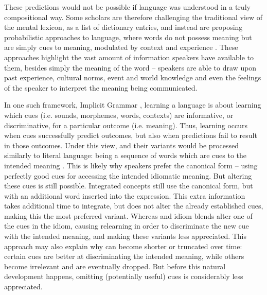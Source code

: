 \documentclass[output=paper
,modfonts
,nonflat]{langsci/langscibook}
\begin{document}
These predictions would not be possible if language was understood in a truly compositional  way. Some scholars are therefore challenging the traditional view of the mental lexicon, as a list of dictionary entries, and instead are proposing probabilistic approaches to language, where words do not possess meaning but are simply cues to meaning, modulated by context and experience \citep{Elman2004, Elman2011, RamscarBaayen2013, RamscarBaayen2013}. These approaches highlight the vast amount of information speakers have available to them, besides simply the meaning of the word -- speakers are able to draw upon past experience, cultural norms, event and world knowledge and even the feelings of the speaker to interpret the meaning being communicated. 

In one such framework, Implicit Grammar \citep{BaayenRamscar2015}, learning a language is about learning which cues (i.e. sounds, morphemes, words, contexts) are informative, or discriminative, for a particular outcome (i.e. meaning). Thus, learning occurs when cues successfully predict outcomes, but also when predictions  fail to result in those outcomes. Under this view,  and their variants  would be processed  similarly to literal  language: being a sequence of words which are cues to the intended meaning \citep[cf.][]{GeeraertEtAl2017}. This is likely why speakers prefer the canonical form -- using perfectly good cues for accessing the intended idiomatic meaning. But altering these cues is still possible. Integrated concepts  still use the canonical form, but with an additional word inserted into the expression. This extra information takes additional time to integrate, but does not alter the already established cues, making this the most preferred variant. Whereas  and idiom blends  alter one of the cues in the idiom, causing relearning in order to discriminate the new cue with the intended meaning, and making these variants less appreciated. This approach may also explain why  can become shorter or truncated  over time: certain cues are better at discriminating the intended meaning, while others become irrelevant and are eventually dropped. But before this natural development happens, omitting (potentially useful) cues is considerably less appreciated. 



\end{document}
